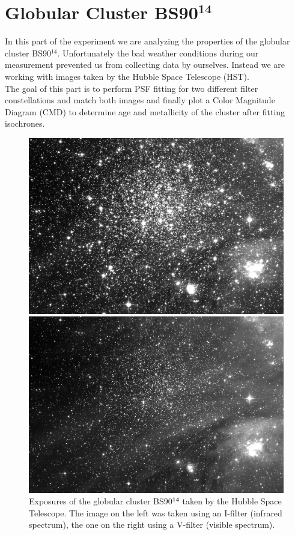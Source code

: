 \chapter{Globular Cluster BS90$^{\mathbf{14}}$}
In this part of the experiment we are analyzing the properties of the globular cluster BS90$^{14}$. Unfortunately the bad weather conditions during our measurement prevented us from collecting data by ourselves. Instead we are working with images taken by the Hubble Space Telescope (HST).\\
The goal of this part is to perform PSF fitting for two different filter constellations and match both images and finally plot a Color Magnitude Diagram (CMD) to determine age and metallicity of the cluster after fitting isochrones.
\begin{figure}[H]
\begin{minipage}{0.49\textwidth}
	\includegraphics[scale = 0.085]{figures/Exposures/BS90_I}
\end{minipage}
\hfill
\begin{minipage}{0.49\textwidth}
\includegraphics[scale = 0.085]{figures/Exposures/BS90_V}
\end{minipage}
\caption{Exposures of the globular cluster BS90$^{\mathbf{14}}$ taken by the Hubble Space Telescope. The image on the left was taken using an I-filter (infrared spectrum), the one on the right using a V-filter (visible spectrum).}
\end{figure}

